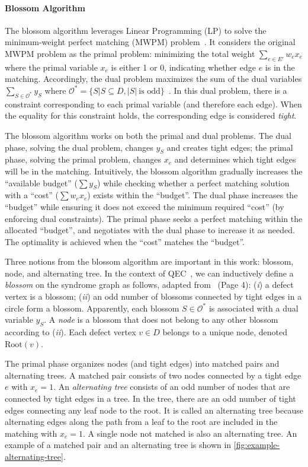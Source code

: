 \paragraph{Blossom Algorithm}
The blossom algorithm leverages Linear Programming (LP) to solve the minimum-weight perfect matching (MWPM) problem~\cite{edmonds1969blossom}.
It considers the original MWPM problem as the primal problem: minimizing the total weight $\sum_{e\in E'} w_e x_e$ where the primal variable $x_e$ is either 1 or 0, indicating whether edge $e$ is in the matching.
Accordingly, the dual problem maximizes the sum of the dual variables $\sum_{S\in \mathcal{O}^*} y_S$ where $\mathcal{O}^* = \{ S | S\subseteq D, |S|\ \text{is odd}\}$~\cite{wu2023qce}.
In this dual problem, there is a constraint corresponding to each primal variable (and therefore each edge). When the equality for this constraint holds,  the corresponding edge is considered \emph{tight}.

The blossom algorithm works on both the primal and dual problems. The dual phase, solving the dual problem, changes $y_S$ and creates tight edges; the primal phase, solving the primal problem, changes $x_e$ and determines which tight edges will be in the matching.
Intuitively, the blossom algorithm gradually increases the ``available budget'' ($\sum y_S$) while checking whether a perfect matching solution with a ``cost'' ($\sum w_e x_e$) exists within the ``budget''.
The dual phase increases the ``budget'' while ensuring it does not exceed the minimum required ``cost'' (by enforcing dual constraints).
The primal phase seeks a perfect matching within the allocated ``budget'', and negotiates with the dual phase to increase it as needed.
The optimality is achieved when the ``cost'' matches the ``budget''.

Three notions from the blossom algorithm are important in this work: blossom, node, and alternating tree.
In the context of QEC~\cite{wu2023qce}, we can inductively define a \emph{blossom} on the syndrome graph as follows, adapted from~\cite{wu2023qce} (Page 4): 
(\textit{i}) a defect vertex is a blossom; (\textit{ii})  an odd number of blossoms connected by tight edges in a circle form a blossom.
Apparently, each blossom $S \in \mathcal{O}^*$ is associated with a dual variable $y_S$.
A \emph{node} is a blossom that does not belong to any other blossom according to (\textit{ii}). 
Each defect vertex $v \in D$ belongs to a unique node, denoted $\text{Root}(v)$.

The primal phase organizes nodes (and tight edges) into matched pairs and alternating trees. A matched pair consists of two nodes connected by a tight edge $e$ with $x_e=1$.
An \emph{alternating tree} consists of an odd number of nodes that are connected by tight edges in a tree.
In the tree, there are an odd number of tight edges connecting any leaf node to the root.
It is called an alternating tree because alternating edges along the path from a leaf to the root are included in the matching with $x_e=1$.
A single node not matched is also an alternating tree.
An example of a matched pair and an alternating tree is shown in \autoref{fig:example-alternating-tree}.

